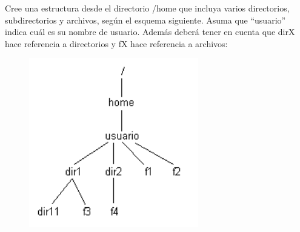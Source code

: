 \begin{questions}
\question Cree una estructura desde el directorio /home que incluya varios directorios, subdirectorios y archivos, según el esquema siguiente. Asuma que “usuario” indica cuál es su nombre de usuario. Además deberá tener en cuenta que dirX hace referencia a directorios y fX hace referencia a archivos:
\begin{figure}
	\centering
	\includegraphics[scale=0.5]{images/ejer12.png}
\end{figure}
\begin{parts}

\end{parts}
\end{questions}
